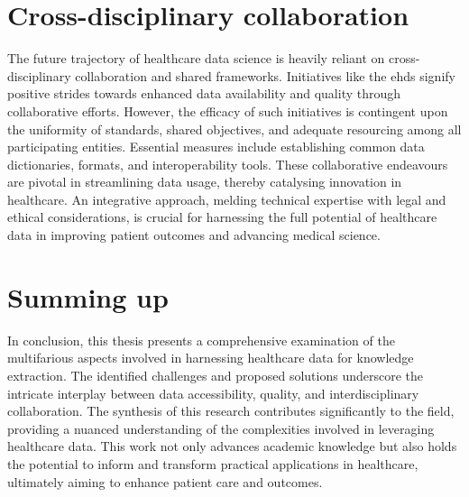 \section{Cross-disciplinary collaboration}
The future trajectory of healthcare data science is heavily reliant on cross-disciplinary collaboration and shared frameworks. Initiatives like the \ac{ehds} signify positive strides towards enhanced data availability and quality through collaborative efforts. However, the efficacy of such initiatives is contingent upon the uniformity of standards, shared objectives, and adequate resourcing among all participating entities. Essential measures include establishing common data dictionaries, formats, and interoperability tools. These collaborative endeavours are pivotal in streamlining data usage, thereby catalysing innovation in healthcare. An integrative approach, melding technical expertise with legal and ethical considerations, is crucial for harnessing the full potential of healthcare data in improving patient outcomes and advancing medical science.


\section{Summing up}

In conclusion, this thesis presents a comprehensive examination of the multifarious aspects involved in harnessing healthcare data for knowledge extraction. The identified challenges and proposed solutions underscore the intricate interplay between data accessibility, quality, and interdisciplinary collaboration. The synthesis of this research contributes significantly to the field, providing a nuanced understanding of the complexities involved in leveraging healthcare data. This work not only advances academic knowledge but also holds the potential to inform and transform practical applications in healthcare, ultimately aiming to enhance patient care and outcomes.




